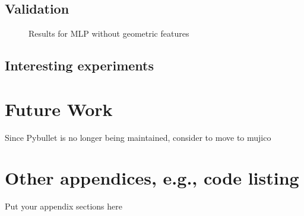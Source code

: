 \documentclass[11pt, a4paper]{report}
\theoremstyle{definition}
\begin{document}
\section{Validation}
\begin{figure}[H]%
    \centering
    \qquad
    \caption{Results for MLP without geometric features}%
    \label{fig:4.2}%
\end{figure}


\section{Interesting experiments}



\chapter{Future Work}
\label{chap:6}
Since Pybullet is no longer being maintained, consider to move to mujico



\appendix
\printbibliography

\chapter{Other appendices, e.g., code listing}
Put your appendix sections here
\end{document}
